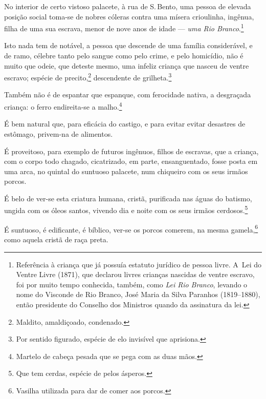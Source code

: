 No interior de certo vistoso palacete, à rua de S.\,Bento, uma pessoa de
elevada posição social toma-se de nobres cóleras contra uma mísera
crioulinha, ingênua, filha de uma sua escrava, menor de nove anos de
idade --- \emph{uma Rio Branco}.\footnote{Referência à criança que já
  possuía estatuto jurídico de pessoa livre. A~Lei do Ventre Livre
  (1871), que declarou livres crianças nascidas de ventre escravo, foi
  por muito tempo conhecida, também, como \emph{Lei Rio Branco}, levando
  o nome do Visconde de Rio Branco, José Maria da Silva Paranhos
  (1819--1880), então presidente do Conselho dos Ministros quando da assinatura da lei.}

Isto nada tem de notável, a pessoa que descende de uma família
considerável, e de ramo, célebre tanto pelo sangue como pelo crime, e
pelo homicídio, não é muito que odeie, que deteste mesmo, uma infeliz
criança que nasceu de ventre escravo; espécie de precito,\footnote{
  Maldito, amaldiçoado, condenado.} descendente de grilheta.\footnote{
  Por sentido figurado, espécie de elo invisível que aprisiona.}

Também não é de espantar que espanque, com ferocidade nativa, a
desgraçada criança: o ferro endireita-se a malho.\footnote{Martelo de
  cabeça pesada que se pega com as duas mãos.}

É bem natural que, para eficácia do castigo, e para evitar evitar %
desastres de estômago, privem-na de alimentos.

É proveitoso, para exemplo de futuros ingênuos, filhos de escravas, que
a criança, com o corpo todo chagado, cicatrizado, em parte,
ensanguentado, fosse posta em uma arca, no quintal do suntuoso palacete,
num chiqueiro com os seus irmãos porcos.

É belo de ver-se esta criatura humana, cristã, purificada nas águas do
batismo, ungida com os óleos santos, vivendo dia e noite com os seus
irmãos cerdosos.\footnote{Que tem cerdas, espécie de pelos ásperos.}

É suntuoso, é edificante, é bíblico, ver-se os porcos comerem, na mesma
gamela,\footnote{Vasilha utilizada para dar de comer aos porcos.} como
aquela cristã de raça preta.

